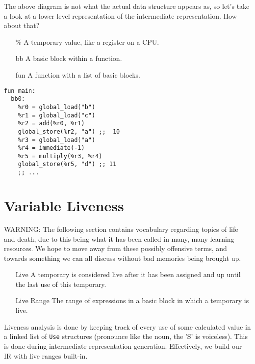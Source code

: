\documentclass[12pt]{report}
\begin{document}

The above diagram is not what the actual data structure appears as, so let's take a look at a lower level representation of the intermediate representation. How about that?

\begin{itemize}
\item[\%]
  A temporary value, like a register on a CPU.
\item[bb]
  A basic block within a function.
\item[fun]
  A function with a list of basic blocks.
\end{itemize}


\begin{Verbatim}[samepage = true]
fun main:
  bb0:
    %r0 = global_load("b")
    %r1 = global_load("c")
    %r2 = add(%r0, %r1)
    global_store(%r2, "a") ;;  10
    %r3 = global_load("a")
    %r4 = immediate(-1)
    %r5 = multiply(%r3, %r4)
    global_store(%r5, "d") ;; 11
    ;; ...
\end{Verbatim}

\section{Variable Liveness}
\label{sec:codegen-variable-liveness}

WARNING: The following section contains vocabulary regarding topics of life and death, due to this being what it has been called in many, many learning resources. We hope to move away from these possibly offensive terms, and towards something we can all discuss without bad memories being brought up.

\begin{itemize}
\item[Live]
  A temporary is considered live after it has been assigned and up until the last use of this temporary.
\item[Live Range]
  The range of expressions in a basic block in which a temporary is live.
\end{itemize}

Liveness analysis is done by keeping track of every use of some calculated value in a linked list of \verb|Use| structures (pronounce like the noun, the 'S' is voiceless). This is done during intermediate representation generation. Effectively, we build our IR with live ranges built-in.
\end{document}
